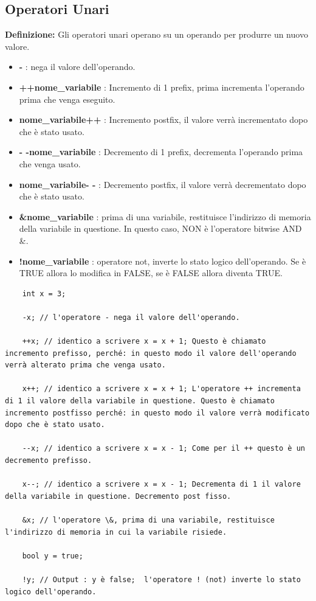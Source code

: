 \subsection{Operatori Unari}

\textsf{\small \textbf{Definizione: } Gli operatori unari operano su un operando per produrre un nuovo valore.} \\

\begin{itemize}
	\item \textsf{\small \textbf{-} : nega il valore dell'operando.}
	\item \textsf{\small \textbf{++nome\_variabile} : Incremento di 1 prefix, prima incrementa l'operando prima che venga eseguito.}
	\item \textsf{\small \textbf{nome\_variabile++} : Incremento postfix, il valore verrà incrementato dopo che è stato usato.}
	\item \textsf{\small \textbf{- -nome\_variabile} : Decremento di 1 prefix, decrementa l'operando prima che venga usato. }
	\item \textsf{\small \textbf{nome\_variabile- -} : Decremento postfix, il valore verrà decrementato dopo che è stato usato.}
	\item \textsf{\small \textbf{\&nome\_variabile} : prima di una variabile, restituisce l'indirizzo di memoria della variabile in questione. In questo caso, NON è l'operatore bitwise AND \&.}
	\item \textsf{\small \textbf{!nome\_variabile} : operatore not, inverte lo stato logico dell'operando. Se è TRUE allora lo modifica in FALSE, se è FALSE allora diventa TRUE.}
\end{itemize}

\begin{lstlisting}
	int x = 3;
	
	-x; // l'operatore - nega il valore dell'operando.
	
	++x; // identico a scrivere x = x + 1; Questo è chiamato incremento prefisso, perché: in questo modo il valore dell'operando verrà alterato prima che venga usato.
	
	x++; // identico a scrivere x = x + 1; L'operatore ++ incrementa di 1 il valore della variabile in questione. Questo è chiamato incremento postfisso perché: in questo modo il valore verrà modificato dopo che è stato usato.
	
	--x; // identico a scrivere x = x - 1; Come per il ++ questo è un decremento prefisso.
	
	x--; // identico a scrivere x = x - 1; Decrementa di 1 il valore della variabile in questione. Decremento post fisso.
	
	&x; // l'operatore \&, prima di una variabile, restituisce l'indirizzo di memoria in cui la variabile risiede.
	
	bool y = true;
	
	!y; // Output : y è false;  l'operatore ! (not) inverte lo stato logico dell'operando.
	
\end{lstlisting}

